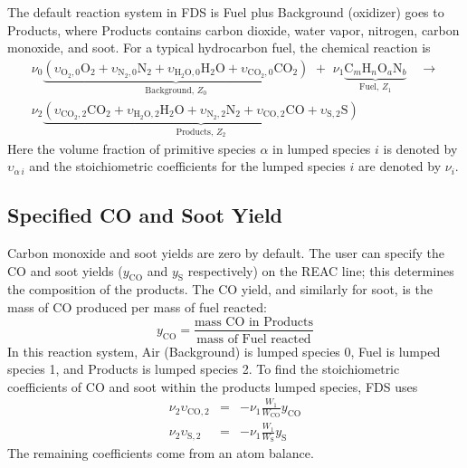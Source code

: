 The default reaction system in FDS is Fuel plus Background (oxidizer) goes to Products, where Products contains carbon dioxide, water vapor, nitrogen, carbon monoxide, and soot. For a typical hydrocarbon fuel, the chemical reaction is
\begin{multline}\label{eq:full_lump}
\nu_{0}\underbrace{(\upsilon_{\mathrm{O}_{2},0}\mathrm{O}_2 +\upsilon_{\mathrm{N}_{2},0}\mathrm{N}_2 + \upsilon_{\mathrm{H}_{2}\mathrm{O},0}\mathrm{H}_2\mathrm{O}+\upsilon_{\mathrm{CO}_{2},0}\mathrm{CO}_2)}_\text{Background,~$Z_0$} \,\,+ \,\, \nu_{1}\underbrace{\mbox{C}_m\mbox{H}_n\mbox{O}_a\mbox{N}_b}_\text{Fuel,~$Z_1$} \quad \longrightarrow \\
\nu_{2}\underbrace{(\upsilon_{\mathrm{CO}_{2},2}\mathrm{CO}_2+\upsilon_{\mathrm{H}_{2}\mathrm{O},2}\mathrm{H}_2\mathrm{O}+\upsilon_{\mathrm{N}_{2},2}\mathrm{N}_2+\upsilon_{\mathrm{CO},2}\mathrm{CO}+\upsilon_{\mathrm{S},2}\mathrm{S})}_\text{Products,~$Z_2$}
\end{multline}
Here the volume fraction of primitive species $\alpha$ in lumped species $i$ is denoted by $\upsilon_{\alpha\,i}$ and the stoichiometric coefficients for the lumped species $i$ are denoted by $\nu_{i}$.

\subsection{Specified CO and Soot Yield}
\label{sec:yield}

Carbon monoxide and soot yields are zero by default. The user can specify the CO and soot yields ($y_{\mathrm{CO}}$ and $y_{\mathrm{S}}$ respectively) on the {\ct REAC} line; this determines the composition of the products. The CO yield, and similarly for soot, is the mass of CO produced per mass of fuel reacted:
\begin{equation}\label{eq:y_co}
y_\mathrm{CO} = \frac{\mbox{mass CO in Products}}{\mbox{mass of Fuel reacted}}
\end{equation}
In this reaction system, Air (Background) is lumped species 0, Fuel is lumped species 1, and Products is lumped species 2. To find the stoichiometric coefficients of CO and soot within the products lumped species, FDS uses
\begin{eqnarray}\label{eq:yields}
\nu_{2}\upsilon_{\mathrm{CO},2}&=&-\nu_{1}\frac{W_1}{W_{\mathrm{CO}}}y_{\mathrm{CO}} \\
\nu_{2}\upsilon_{\mathrm{S},2}&=&-\nu_{1}\frac{W_1}{W_{\mathrm{S}}}y_{\mathrm{S}}
\end{eqnarray}
The remaining coefficients come from an atom balance.


